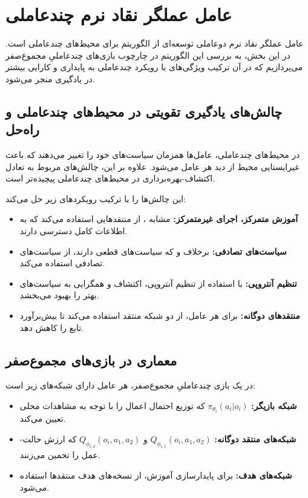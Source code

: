 \section{عامل عملگر نقاد نرم چند­عاملی}\label{sec:MASAC}

عامل عملگر نقاد نرم دو­عاملی
توسعه‌ای از الگوریتم  برای محیط‌های چند­عاملی است. در این بخش، به بررسی این الگوریتم در چارچوب بازی‌های چندعاملیِ مجموع­‌صفر می‌پردازیم که در آن ترکیب ویژگی‌های  با رویکرد چند­عاملی به پایداری و کارایی بیشتر در یادگیری منجر می‌شود.

\subsection{چالش‌های یادگیری تقویتی در محیط‌های چند­عاملی و راه‌حل }

در محیط‌های چند­عاملی، عامل‌ها همزمان سیاست‌های خود را تغییر می‌دهند که باعث غیرایستایی محیط از دید هر عامل می‌شود. علاوه بر این، چالش‌های مربوط به تعادل اکتشاف-بهره‌برداری در محیط‌های چند­عاملی پیچیده‌تر است.

 این چالش‌ها را با ترکیب رویکردهای زیر حل می‌کند:
\begin{itemize}
    \item \textbf{آموزش متمرکز، اجرای غیرمتمرکز:} مشابه ، از منتقدهایی استفاده می‌کند که به اطلاعات کامل دسترسی دارند.
    \item \textbf{سیاست‌های تصادفی:} برخلاف  و  که سیاست‌های قطعی دارند،  از سیاست‌های تصادفی استفاده می‌کند.
    \item \textbf{تنظیم آنتروپی:} با استفاده از تنظیم آنتروپی، اکتشاف و همگرایی به سیاست‌های بهتر را بهبود می‌بخشد.
    \item \textbf{منتقدهای دوگانه:} برای هر عامل، از دو شبکه منتقد استفاده می‌کند تا بیش‌برآورد تابع  را کاهش دهد.
\end{itemize}

\subsection{معماری  در بازی‌های مجموع­‌صفر}

در یک بازی چندعاملیِ مجموع­‌صفر، هر عامل دارای شبکه‌های زیر است:

\begin{itemize}
    \item \textbf{شبکه بازیگر:} $\pi_{\theta_i}(a_i|o_i)$ که توزیع احتمال اعمال را با توجه به مشاهدات محلی تعیین می‌کند.
    \item \textbf{شبکه‌های منتقد دوگانه:} $Q_{\phi_{i,1}}(o_i, a_1, a_2)$ و $Q_{\phi_{i,2}}(o_i, a_1, a_2)$ که ارزش حالت-عمل را تخمین می‌زنند.
    \item \textbf{شبکه‌های هدف:} برای پایدارسازی آموزش، از نسخه‌های هدف منتقدها استفاده می‌شود.
\end{itemize}

